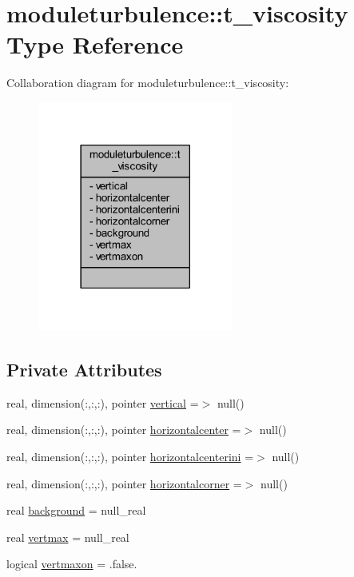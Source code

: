 \hypertarget{structmoduleturbulence_1_1t__viscosity}{}\section{moduleturbulence\+:\+:t\+\_\+viscosity Type Reference}
\label{structmoduleturbulence_1_1t__viscosity}


Collaboration diagram for moduleturbulence\+:\+:t\+\_\+viscosity\+:\nopagebreak
\begin{figure}[H]
\begin{center}
\leavevmode
\includegraphics[width=182pt]{structmoduleturbulence_1_1t__viscosity__coll__graph}
\end{center}
\end{figure}
\subsection*{Private Attributes}
\begin{DoxyCompactItemize}
\item 
real, dimension(\+:,\+:,\+:), pointer \mbox{\hyperlink{structmoduleturbulence_1_1t__viscosity_acb8145bff9c976ab31a65cb8f1a52b3d}{vertical}} =$>$ null()
\item 
real, dimension(\+:,\+:,\+:), pointer \mbox{\hyperlink{structmoduleturbulence_1_1t__viscosity_a6feb4ceea9a8ac08770f3cd8dbaa14eb}{horizontalcenter}} =$>$ null()
\item 
real, dimension(\+:,\+:,\+:), pointer \mbox{\hyperlink{structmoduleturbulence_1_1t__viscosity_aa33915c9ddc3f88211cda639768d7167}{horizontalcenterini}} =$>$ null()
\item 
real, dimension(\+:,\+:,\+:), pointer \mbox{\hyperlink{structmoduleturbulence_1_1t__viscosity_a84049c1d39432848ab5b113f2237ea6a}{horizontalcorner}} =$>$ null()
\item 
real \mbox{\hyperlink{structmoduleturbulence_1_1t__viscosity_a2b0b05401d6686e691bbc19c35ce0977}{background}} = null\+\_\+real
\item 
real \mbox{\hyperlink{structmoduleturbulence_1_1t__viscosity_a2002b4fab00734ca20d58d5ed1542802}{vertmax}} = null\+\_\+real
\item 
logical \mbox{\hyperlink{structmoduleturbulence_1_1t__viscosity_ae6c9d80483099fa116edc78650b7fdfc}{vertmaxon}} = .false.
\end{DoxyCompactItemize}



